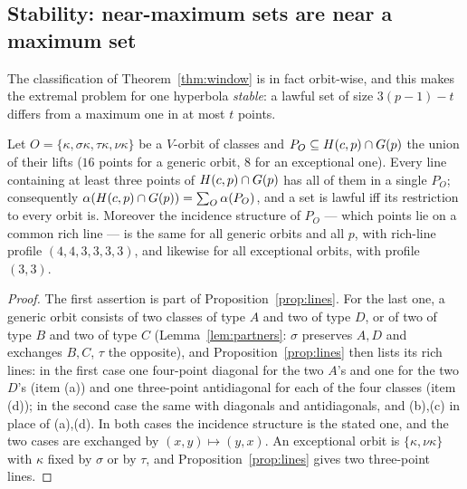 \subsection*{Stability: near-maximum sets are near a maximum set}

The classification of Theorem~\ref{thm:window} is in fact orbit-wise, and this makes the extremal problem for one hyperbola
\emph{stable}: a lawful set of size $3(p-1)-t$ differs from a maximum one in at most $t$ points.

\begin{lemma}\label{lem:orbdec}
Let $O=\{\kappa,\sigma\kappa,\tau\kappa,\nu\kappa\}$ be a $V$-orbit of classes and $P_O\subseteq H(c,p)\cap G(p)$ the union of their lifts
($16$ points for a generic orbit, $8$ for an exceptional one).  Every line containing at least three points of $H(c,p)\cap G(p)$ has all of
them in a single $P_O$; consequently $\alpha(H(c,p)\cap G(p))=\sum_O\alpha(P_O)$, and a set is lawful iff its restriction to every orbit is.
Moreover the incidence structure of $P_O$ --- which points lie on a common rich line --- is the same for all generic orbits and all $p$,
with rich-line profile $(4,4,3,3,3,3)$, and likewise for all exceptional orbits, with profile $(3,3)$.
\end{lemma}
\begin{proof}
The first assertion is part of Proposition~\ref{prop:lines}.  For the last one, a generic orbit consists of two classes of type $A$ and two
of type $D$, or of two of type $B$ and two of type $C$ (Lemma~\ref{lem:partners}: $\sigma$ preserves $A,D$ and exchanges $B,C$, $\tau$ the
opposite), and Proposition~\ref{prop:lines} then lists its rich lines: in the first case one four-point diagonal for the two $A$'s and one
for the two $D$'s (item (a)) and one three-point antidiagonal for each of the four classes (item (d)); in the second case the same with
diagonals and antidiagonals, and (b),(c) in place of (a),(d).  In both cases the incidence structure is the stated one, and the two cases
are exchanged by $(x,y)\mapsto(y,x)$.  An exceptional orbit is $\{\kappa,\nu\kappa\}$ with $\kappa$ fixed by $\sigma$ or by $\tau$, and
Proposition~\ref{prop:lines} gives two three-point lines.
\end{proof}

